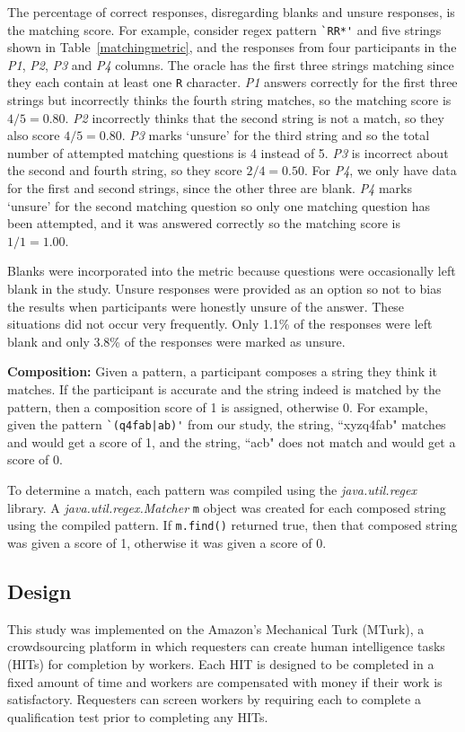  The percentage of correct responses, disregarding blanks and unsure responses, is the matching score.
 For example, consider regex pattern \verb!`RR*'! and five strings shown in Table~\ref{matchingmetric}, and the responses from four participants in the \emph{P1}, \emph{P2}, \emph{P3} and \emph{P4} columns.
 The oracle has the first three strings matching since they each contain at least one \verb!R! character. \emph{P1} answers correctly for the first three strings but incorrectly thinks the fourth string matches, so the matching score is $4/5 = 0.80$. \emph{P2} incorrectly thinks that the second string is not a match, so they also score $4/5 = 0.80$.  \emph{P3} marks `unsure' for the third string and so the total number of attempted matching questions is 4 instead of 5. \emph{P3} is incorrect about the second and fourth string, so they score $2/4 = 0.50$.  For \emph{P4}, we only have data for the first and second strings, since the other three are blank.  \emph{P4} marks `unsure' for the second matching question so only one matching question has been attempted, and it was answered correctly so the matching score is $1/1 = 1.00$.

Blanks were incorporated into the metric because questions were occasionally left blank in the study. Unsure responses were provided as an option so not to bias the  results when participants were honestly unsure of the answer. These situations did not occur very frequently. Only 1.1\% of the responses were left blank and only 3.8\% of the responses were marked as unsure.


\textbf{Composition:}
Given a pattern, a participant composes a string they think it matches. If the participant is accurate and the string indeed is matched by the pattern, then a composition score of 1 is assigned, otherwise 0.  For example, given the pattern \verb!`(q4fab|ab)'! from our study, the string, ``xyzq4fab" matches  and would get a score of 1, and the string, ``acb" does not match and would get a score of 0.

To determine a match, each pattern was compiled using the \emph{java.util.regex} library. A \emph{java.util.regex.Matcher} \verb!m! object was created for each composed string using the compiled pattern.  If \verb!m.find()! returned true, then that composed string was given a score of 1, otherwise it was given a score of 0.



\subsection{Design}
This study was implemented on the Amazon's Mechanical Turk (MTurk),  a crowdsourcing platform in which requesters can create human intelligence tasks (HITs) for completion by workers. Each HIT is designed to be completed in a fixed amount of time and workers are compensated with money if their work is satisfactory. Requesters can screen workers by requiring each to complete a qualification test prior to completing any HITs.

